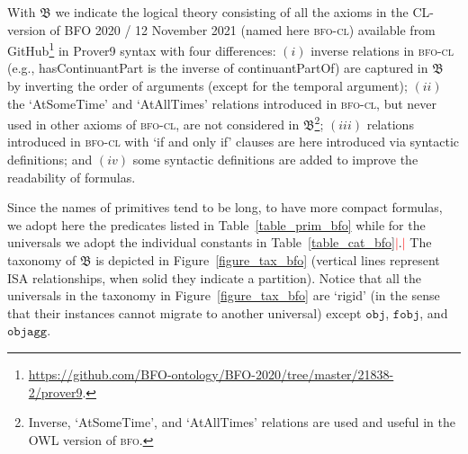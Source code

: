 \documentclass[ao]{iosart2x}
\newcommand{\nb}[1]{\textcolor{red}{$|$}\marginpar{\hspace*{-0cm}\parbox{20mm}{\scriptsize\raggedright\textcolor{red}{#1}}}}
\newcommand{\bfoDefLabel}{\textrm{d$_\texttt{b}$}}
\newcommand{\refbfodf}[1]{({\bfoDefLabel}\ref{#1})}
\newcommand{\cn}[1]{\mathtt{#1}}
\newcommand{\dolce}{{\textsc{dolce}}}
\newcommand{\bfo}{{\textsc{bfo}}}
\newcommand{\bfocl}{{\textsc{bfo-cl}}}
\newcommand {\thbfo} {\ensuremath{\mathfrak{B}}}
\newcommand{\objbcat}{\cn{obj}}
\newcommand{\fobjbcat}{\cn{fobj}}
\newcommand{\objaggbcat}{\cn{objagg}}
\begin{document}
%
With $\thbfo$ we indicate the logical theory consisting of all the axioms in the CL-version of BFO 2020 / 12 November 2021 (named here {\bfocl}) available from GitHub\footnote{\url{https://github.com/BFO-ontology/BFO-2020/tree/master/21838-2/prover9}.} in Prover9 syntax with four differences: $(i)$ inverse relations in {\bfocl} (e.g., hasContinuantPart is the inverse of continuantPartOf) are captured in $\thbfo$ by inverting the order of arguments (except for the temporal argument);  $(ii)$ the `AtSomeTime' and `AtAllTimes' relations introduced in {\bfocl}, but never used in other axioms of {\bfocl}, are not considered in $\thbfo$\footnote{Inverse, `AtSomeTime', and `AtAllTimes' relations are used and useful in the OWL version of {\bfo}.}; $(iii)$ relations introduced in {\bfocl} with `if and only if' clauses are here introduced via syntactic definitions;
and $(iv)$ some syntactic definitions are added to improve the readability of formulas.

Since the names of primitives tend to be long, to have more compact formulas, we adopt here the predicates listed in Table~\ref{table_prim_bfo} while for the universals we adopt the individual constants in Table~\ref{table_cat_bfo}\nb{FC: PAR non è una costante. Assieme a "entity(.)" e a "UNI(.)" è un predicato. Inserire tutti e tre in tabella 1 oppure aggiungere UNI e entity nella 2?}.\nb{CM: aggiungere nelle tabelle le primitive che si trovano nel file CL; FC: adesso, le uniche non menzionate sono entità e universale, mancavano inerenza [che è definita, quindi ok] e occorrenti} The taxonomy of $\thbfo$ is depicted in Figure~\ref{figure_tax_bfo} (vertical lines represent ISA relationships, when solid they indicate a partition). Notice that all the universals in the taxonomy in Figure~\ref{figure_tax_bfo} are `rigid' (in the sense that their instances cannot migrate to another universal) except $\objbcat$, $\fobjbcat$, and $\objaggbcat$. %
\end{document}
